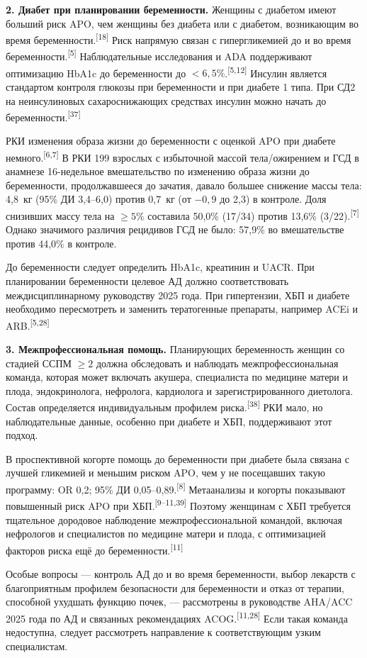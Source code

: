 \documentclass[11pt,a4paper]{article}
\newcommand{\src}[1]{\textsuperscript{[#1]}}
\begin{document}
\textbf{2. Диабет при планировании беременности.} Женщины с диабетом имеют больший риск APO, чем женщины без диабета или с диабетом, возникающим во время беременности.\src{18} Риск напрямую связан с гипергликемией до и во время беременности.\src{5} Наблюдательные исследования и ADA поддерживают оптимизацию HbA1c до беременности до $<6{,}5\%$.\src{5,12} Инсулин является стандартом контроля глюкозы при беременности и при диабете 1 типа. При СД2 на неинсулиновых сахароснижающих средствах инсулин можно начать до беременности.\src{37}

РКИ изменения образа жизни до беременности с оценкой APO при диабете немного.\src{6,7} В РКИ 199 взрослых с избыточной массой тела/ожирением и ГСД в анамнезе 16-недельное вмешательство по изменению образа жизни до беременности, продолжавшееся до зачатия, давало большее снижение массы тела: 4,8~кг (95\% ДИ 3,4--6,0) против 0,7~кг (от $-0{,}9$ до 2,3) в контроле. Доля снизивших массу тела на $\geq5\%$ составила 50,0\% (17/34) против 13,6\% (3/22).\src{7} Однако значимого различия рецидивов ГСД не было: 57,9\% во вмешательстве против 44,0\% в контроле.

До беременности следует определить HbA1c, креатинин и UACR. При планировании беременности целевое АД должно соответствовать междисциплинарному руководству 2025 года. При гипертензии, ХБП и диабете необходимо пересмотреть и заменить тератогенные препараты, например ACEi и ARB.\src{5,28}

\textbf{3. Межпрофессиональная помощь.} Планирующих беременность женщин со стадией ССПМ $\geq2$ должна обследовать и наблюдать межпрофессиональная команда, которая может включать акушера, специалиста по медицине матери и плода, эндокринолога, нефролога, кардиолога и зарегистрированного диетолога. Состав определяется индивидуальным профилем риска.\src{38} РКИ мало, но наблюдательные данные, особенно при диабете и ХБП, поддерживают этот подход.

В проспективной когорте помощь до беременности при диабете была связана с лучшей гликемией и меньшим риском APO, чем у не посещавших такую программу: OR 0,2; 95\% ДИ 0,05--0,89.\src{8} Метаанализы и когорты показывают повышенный риск APO при ХБП.\src{9--11,39} Поэтому женщинам с ХБП требуется тщательное дородовое наблюдение межпрофессиональной командой, включая нефрологов и специалистов по медицине матери и плода, с оптимизацией факторов риска ещё до беременности.\src{11}

Особые вопросы --- контроль АД до и во время беременности, выбор лекарств с благоприятным профилем безопасности для беременности и отказ от терапии, способной ухудшать функцию почек, --- рассмотрены в руководстве AHA/ACC 2025 года по АД и связанных рекомендациях ACOG.\src{11,28} Если такая команда недоступна, следует рассмотреть направление к соответствующим узким специалистам.
\end{document}
